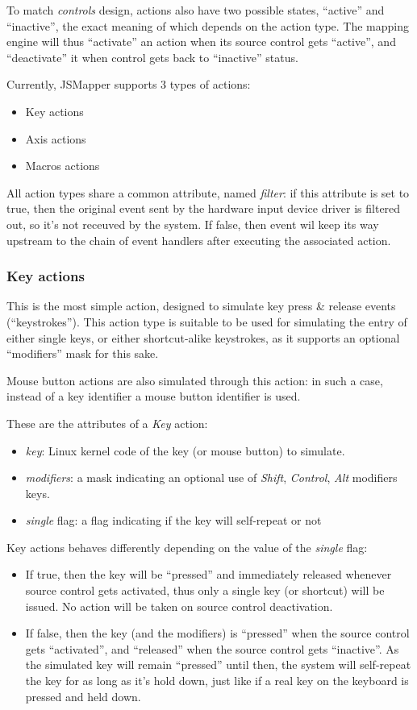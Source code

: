 To match \emph{controls} design, actions also have two possible states, ``active'' and ``inactive'', the exact meaning of which depends on the action type. The mapping engine will thus ``activate'' an action when its source control gets ``active'', and ``deactivate'' it when control gets back to ``inactive'' status.

Currently, JSMapper supports 3 types of actions:
\begin{itemize}
	\item Key actions
	\item Axis actions
	\item Macros actions
\end{itemize}

All action types share a common attribute, named \emph{filter}: if this attribute is set to true, then the original event sent by the hardware input device driver is filtered out, so it's not receuved by the system. If false, then event wil keep its way upstream to the chain of event handlers after executing the associated action.


\subsubsection{Key actions}
This is the most simple action, designed to simulate key press \& release events (``keystrokes''). This action type is suitable to be used for simulating the entry of either single keys, or either shortcut-alike keystrokes, as it supports an optional ``modifiers'' mask for this sake.

Mouse button actions are also simulated through this action: in such a case, instead of a key identifier a mouse button identifier is used.

These are the attributes of a \emph{Key} action:
\begin{itemize}
	\item \emph{key}: Linux kernel code of the key (or mouse button) to simulate.
	\item \emph{modifiers}: a mask indicating an optional use of \emph{Shift}, \emph{Control}, \emph{Alt} modifiers keys.
	\item \emph{single} flag: a flag indicating if the key will self-repeat or not
\end{itemize}

Key actions behaves differently depending on the value of the \emph{single} flag:
\begin{itemize}
	\item If true, then the key will be ``pressed'' and immediately released whenever source control gets activated, thus only a single key (or shortcut) will be issued. No action will be taken on source control deactivation.
	\item If false, then the key (and the modifiers) is ``pressed'' when the source control gets ``activated'', and ``released'' when the source control gets ``inactive''. As the simulated key will remain ``pressed'' until then, the system will self-repeat the key for as long as it's hold down, just like if a real key on the keyboard is pressed and held down.
\end{itemize}


